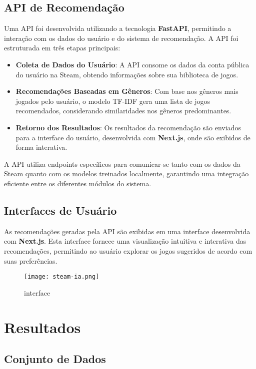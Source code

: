 \documentclass[conference]{IEEEtran}
\begin{document}
\subsection{API de Recomendação}

Uma API foi desenvolvida utilizando a tecnologia \textbf{FastAPI}, permitindo a interação com os dados do usuário e do sistema de recomendação. A API foi estruturada em três etapas principais:
\begin{itemize}
    \item \textbf{Coleta de Dados do Usuário}: A API consome os dados da conta pública do usuário na Steam, obtendo informações sobre sua biblioteca de jogos.
    \item \textbf{Recomendações Baseadas em Gêneros}: Com base nos gêneros mais jogados pelo usuário, o modelo TF-IDF gera uma lista de jogos recomendados, considerando similaridades nos gêneros predominantes.
    \item \textbf{Retorno dos Resultados}: Os resultados da recomendação são enviados para a interface do usuário, desenvolvida com \textbf{Next.js}, onde são exibidos de forma interativa.
\end{itemize}

A API utiliza endpoints específicos para comunicar-se tanto com os dados da Steam quanto com os modelos treinados localmente, garantindo uma integração eficiente entre os diferentes módulos do sistema.

\subsection{Interfaces de Usuário}

As recomendações geradas pela API são exibidas em uma interface desenvolvida com \textbf{Next.js}. Esta interface fornece uma visualização intuitiva e interativa das recomendações, permitindo ao usuário explorar os jogos sugeridos de acordo com suas preferências.

\begin{figure}
    \centering
    \texttt{[image: steam-ia.png]}
    \caption{interface}
    \label{fig:interface}
\end{figure}

\section{Resultados}

\subsection{Conjunto de Dados}
\end{document}
